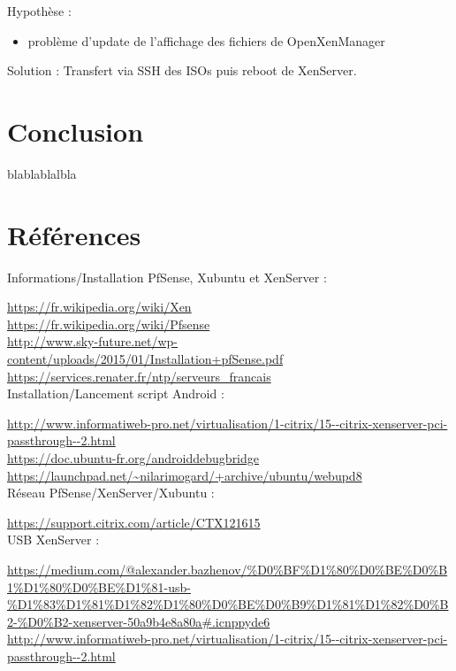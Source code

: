 \documentclass[a4paper,12pt]{extarticle}
\begin{document}
Hypothèse :
\begin{itemize}
\item problème d'update de l'affichage des fichiers de OpenXenManager\\
\end{itemize}

Solution :
Transfert via SSH des ISOs puis reboot de XenServer.

\clearpage

\section{Conclusion}
blablablalbla

\section{Références}

Informations/Installation PfSense, Xubuntu et XenServer :

\url{https://fr.wikipedia.org/wiki/Xen}\\
\url{https://fr.wikipedia.org/wiki/Pfsense}\\
\url{http://www.sky-future.net/wp-content/uploads/2015/01/Installation+pfSense.pdf}\\
\url{https://services.renater.fr/ntp/serveurs_francais}\\

Installation/Lancement script Android :

\url{http://www.informatiweb-pro.net/virtualisation/1-citrix/15--citrix-xenserver-pci-passthrough--2.html}\\
\url{https://doc.ubuntu-fr.org/androiddebugbridge}\\
\url{https://launchpad.net/~nilarimogard/+archive/ubuntu/webupd8}\\

Réseau PfSense/XenServer/Xubuntu :

\url{https://support.citrix.com/article/CTX121615}\\

USB XenServer :

\url{https://medium.com/@alexander.bazhenov/\%D0\%BF\%D1\%80\%D0\%BE\%D0\%B1\%D1\%80\%D0\%BE\%D1\%81-usb-\%D1\%83\%D1\%81\%D1\%82\%D1\%80\%D0\%BE\%D0\%B9\%D1\%81\%D1\%82\%D0\%B2-\%D0\%B2-xenserver-50a9b4e8a80a#.icnppyde6}\\
\url{http://www.informatiweb-pro.net/virtualisation/1-citrix/15--citrix-xenserver-pci-passthrough--2.html}\\
\end{document}
